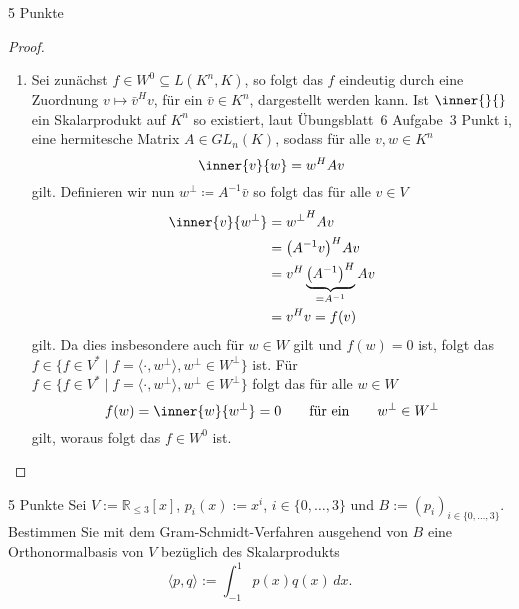 \documentclass{problemset}
\begin{document}
\begin{problem}{5 Punkte}
\begin{proof}
\begin{enumerate}
        \item Sei zunächst \(f \in W^0 \subseteq L(K^n, K)\), so folgt das
              \(f\) eindeutig durch eine Zuordnung \(v \mapsto \bar{v}^H v\),
              für ein \(\bar{v} \in K^n\), dargestellt werden kann. Ist
              \(\inner{}{}\) ein Skalarprodukt auf \(K^n\) so existiert, laut
              Übungsblatt~6 Aufgabe~3 Punkt i, eine hermitesche Matrix \(A \in
              GL_n(K)\), sodass für alle \(v, w \in K^n\)
              \begin{equation*}
                  \inner{v}{w} = w^H A v
              \end{equation*}
              gilt.
              Definieren wir nun \(w^\perp \coloneq A^{-1} \bar{v}\) so folgt das für alle \(v \in V\)
              \begin{align*}
                  \inner{v}{w^\perp} & = {w^\perp}^H A v                                        \\
                                     & = {\left(A^{-1}v\right)}^H A v                           \\
                                     & = v^H \underbrace{{\left(A^{-1}\right)}^H}_{=A^{-1}} A v \\
                                     & = v^H v = f(v)
              \end{align*}
              gilt.
              Da dies insbesondere auch für \(w \in W\) gilt und \(f(w) = 0\) ist, folgt das \(f \in \{f \in
              V^* \mid f = \langle \cdot , w^\perp \rangle, w^\perp \in W^\perp\}\) ist.
              Für \(f \in \{f \in
              V^* \mid f = \langle \cdot , w^\perp \rangle, w^\perp \in W^\perp\}\) folgt das für alle \(w \in W\)
              \begin{equation*}
                  f(w) = \inner{w}{w^\perp} = 0 \qquad \text{für ein} \qquad w^\perp \in W^\perp
              \end{equation*}
              gilt, woraus folgt das \(f \in W^0\) ist.
    \end{enumerate}
\end{proof}

\end{problem}

\begin{problem}{5 Punkte}
Sei $V := \mathbb{R}_{\leq 3}[x]$, $p_i(x) := x^i$, $i \in \{0, \ldots, 3\}$
und $B := (p_i)_{i \in \{0, \ldots, 3\}}$. Bestimmen Sie mit dem
Gram-Schmidt-Verfahren ausgehend von $B$ eine Orthonormalbasis von $V$
bezüglich des Skalarprodukts
\[
    \langle p, q \rangle := \int_{-1}^{1} p(x) q(x) \, dx.
\]
\end{problem}
\end{document}
